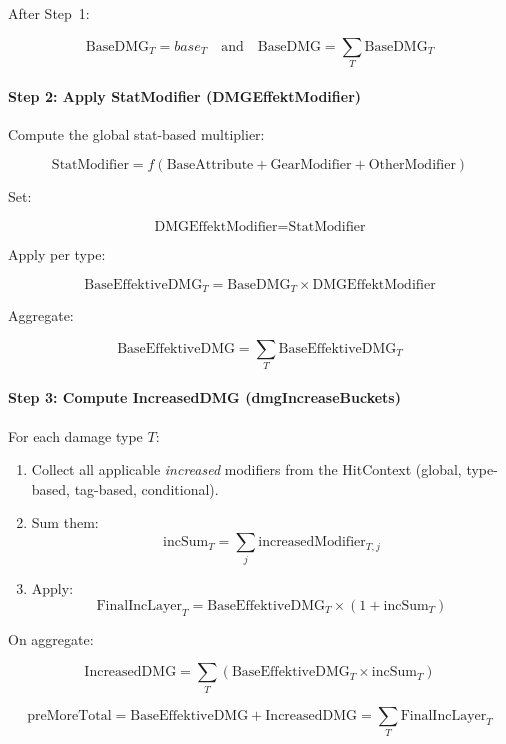 After Step~1:

\[
\text{BaseDMG}_T = base_T
\quad\text{and}\quad
\text{BaseDMG} = \sum_T \text{BaseDMG}_T
\]

\paragraph{Step 2: Apply StatModifier (DMGEffektModifier)}

Compute the global stat-based multiplier:

\[
\text{StatModifier} = f(\text{BaseAttribute} + \text{GearModifier} + \text{OtherModifier})
\]

Set:

\[
\text{DMGEffektModifier} = \text{StatModifier}
\]

Apply per type:

\[
\text{BaseEffektiveDMG}_T = \text{BaseDMG}_T \times \text{DMGEffektModifier}
\]

Aggregate:

\[
\text{BaseEffektiveDMG} = \sum_T \text{BaseEffektiveDMG}_T
\]

\paragraph{Step 3: Compute IncreasedDMG (dmgIncreaseBuckets)}

For each damage type $T$:

\begin{enumerate}
	\item Collect all applicable \emph{increased} modifiers from the HitContext
	(global, type-based, tag-based, conditional).
	\item Sum them:
	\[
	\text{incSum}_T = \sum_j \text{increasedModifier}_{T,j}
	\]
	\item Apply:
	\[
	\text{FinalIncLayer}_T = \text{BaseEffektiveDMG}_T \times (1 + \text{incSum}_T)
	\]
\end{enumerate}

On aggregate:

\[
\text{IncreasedDMG} = \sum_T \left(\text{BaseEffektiveDMG}_T \times \text{incSum}_T\right)
\]

\[
\text{preMoreTotal} = \text{BaseEffektiveDMG} + \text{IncreasedDMG}
= \sum_T \text{FinalIncLayer}_T
\]

